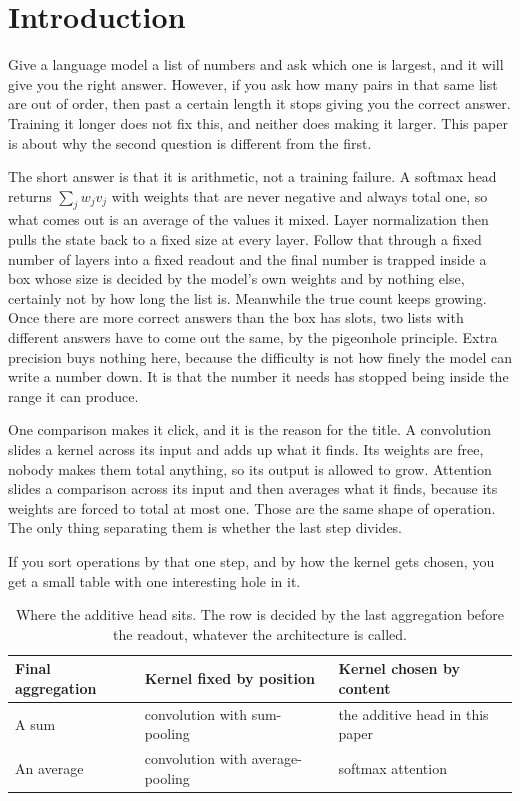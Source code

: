 \documentclass[10pt]{article}
\theoremstyle{definition}
\begin{document}
\section{Introduction}
\label{sec:intro}

Give a language model a list of numbers and ask which one is largest, and
it will give you the right answer. However, if you ask how many pairs in
that same list are out of order, then past a certain length it stops
giving you the correct answer. Training it longer does not fix this, and
neither does making it larger. This
paper is about why the second question is different from the first.

The short answer is that it is arithmetic, not a training failure. A
softmax head returns $\sum_j w_j v_j$ with weights that are never negative
and always total one, so what comes out is an average of the values it
mixed. Layer normalization then pulls the state back to a fixed size at
every layer. Follow that through a fixed number of layers into a fixed
readout and the final number is trapped inside a box whose size is decided
by the model's own weights and by nothing else, certainly not by how long
the list is. Meanwhile the true count keeps growing. Once there are
more correct answers than the box has slots, two lists with different
answers have to come out the same, by the pigeonhole principle. Extra
precision buys nothing here, because the difficulty is not how finely the
model can write a number down. It is that the number it needs has stopped
being inside the range it can produce.

One comparison makes it click, and it is the reason
for the title. A convolution slides a kernel across its input and adds up
what it finds. Its weights are free, nobody makes them total anything, so
its output is allowed to grow. Attention slides a comparison across its
input and then averages what it finds, because its weights are forced to
total at most one. Those are the same shape of operation. The only thing
separating them is whether the last step divides.

If you sort operations by that one step, and by how the kernel gets
chosen, you get a small table with one interesting hole in it.

\begin{table}[htbp]
\centering
\caption{Where the additive head sits. The row is decided by the last
aggregation before the readout, whatever the architecture is called.}
\label{tab:twobytwo}
\begin{tabular}{@{}lll@{}}
\toprule
\textbf{Final aggregation} & \textbf{Kernel fixed by position} & \textbf{Kernel chosen by content} \\
\midrule
A sum & convolution with sum-pooling & the additive head in this paper \\
An average & convolution with average-pooling & softmax attention \\
\bottomrule
\end{tabular}
\end{table}
\end{document}
